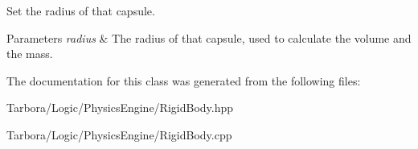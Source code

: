 Set the radius of that capsule. 


\begin{DoxyParams}{Parameters}
{\em radius} & The radius of that capsule, used to calculate the volume and the mass. \\
\hline
\end{DoxyParams}


The documentation for this class was generated from the following files\+:\begin{DoxyCompactItemize}
\item 
Tarbora/\+Logic/\+Physics\+Engine/Rigid\+Body.\+hpp\item 
Tarbora/\+Logic/\+Physics\+Engine/Rigid\+Body.\+cpp\end{DoxyCompactItemize}
